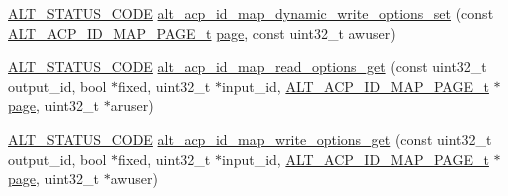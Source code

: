 \begin{DoxyCompactItemize}
\item 
\mbox{\hyperlink{hwlib_8h_abdb0d369f069723ca55d6c94bcaaaa12}{A\+L\+T\+\_\+\+S\+T\+A\+T\+U\+S\+\_\+\+C\+O\+DE}} \mbox{\hyperlink{group__ADDR__SPACE__MGR__MEM__COHERENCE_ga7dfbf9c206a906241bd6464cba8109ca}{alt\+\_\+acp\+\_\+id\+\_\+map\+\_\+dynamic\+\_\+write\+\_\+options\+\_\+set}} (const \mbox{\hyperlink{group__ADDR__SPACE__MGR__MEM__COHERENCE_ga76f004ab7bdcd5ccff68cf02fb9e5f5d}{A\+L\+T\+\_\+\+A\+C\+P\+\_\+\+I\+D\+\_\+\+M\+A\+P\+\_\+\+P\+A\+G\+E\+\_\+t}} \mbox{\hyperlink{structpage}{page}}, const uint32\+\_\+t awuser)
\item 
\mbox{\hyperlink{hwlib_8h_abdb0d369f069723ca55d6c94bcaaaa12}{A\+L\+T\+\_\+\+S\+T\+A\+T\+U\+S\+\_\+\+C\+O\+DE}} \mbox{\hyperlink{group__ADDR__SPACE__MGR__MEM__COHERENCE_ga123330082cfc1877a9bcb9a1764e176b}{alt\+\_\+acp\+\_\+id\+\_\+map\+\_\+read\+\_\+options\+\_\+get}} (const uint32\+\_\+t output\+\_\+id, bool $\ast$fixed, uint32\+\_\+t $\ast$input\+\_\+id, \mbox{\hyperlink{group__ADDR__SPACE__MGR__MEM__COHERENCE_ga76f004ab7bdcd5ccff68cf02fb9e5f5d}{A\+L\+T\+\_\+\+A\+C\+P\+\_\+\+I\+D\+\_\+\+M\+A\+P\+\_\+\+P\+A\+G\+E\+\_\+t}} $\ast$\mbox{\hyperlink{structpage}{page}}, uint32\+\_\+t $\ast$aruser)
\item 
\mbox{\hyperlink{hwlib_8h_abdb0d369f069723ca55d6c94bcaaaa12}{A\+L\+T\+\_\+\+S\+T\+A\+T\+U\+S\+\_\+\+C\+O\+DE}} \mbox{\hyperlink{group__ADDR__SPACE__MGR__MEM__COHERENCE_ga2f453fd50942f93d922328097f43d1de}{alt\+\_\+acp\+\_\+id\+\_\+map\+\_\+write\+\_\+options\+\_\+get}} (const uint32\+\_\+t output\+\_\+id, bool $\ast$fixed, uint32\+\_\+t $\ast$input\+\_\+id, \mbox{\hyperlink{group__ADDR__SPACE__MGR__MEM__COHERENCE_ga76f004ab7bdcd5ccff68cf02fb9e5f5d}{A\+L\+T\+\_\+\+A\+C\+P\+\_\+\+I\+D\+\_\+\+M\+A\+P\+\_\+\+P\+A\+G\+E\+\_\+t}} $\ast$\mbox{\hyperlink{structpage}{page}}, uint32\+\_\+t $\ast$awuser)
\end{DoxyCompactItemize}
